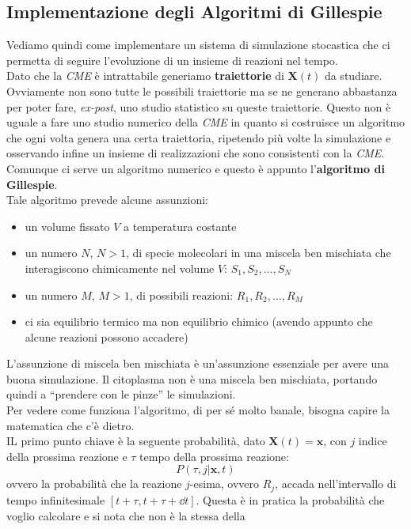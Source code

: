 \documentclass[a4paper,12pt, oneside]{book}
\begin{document}
\subsection{Implementazione degli Algoritmi di Gillespie}
Vediamo quindi come implementare un sistema di simulazione stocastica che ci
permetta di seguire l'evoluzione di un insieme di reazioni nel tempo.\\
Dato che la \textit{CME} è intrattabile generiamo \textbf{traiettorie} di
$\mathbf{X}(t)$ da studiare. Ovviamente non sono tutte le possibili traiettorie
ma se ne generano abbastanza per poter fare, \textit{ex-post}, uno studio
statistico su queste traiettorie. Questo non è uguale a fare uno studio numerico
della \textit{CME} in quanto si costruisce un algoritmo che ogni volta genera
una certa traiettoria, ripetendo più volte la simulazione e osservando infine un
insieme di realizzazioni che sono consistenti con la \textit{CME}.\\
Comunque ci serve un algoritmo numerico e questo è appunto l'\textbf{algoritmo
  di Gillespie}.\\
Tale algoritmo prevede alcune assunzioni:
\begin{itemize}
  \item un volume fissato $V$ a temperatura costante
  \item un numero $N$, $N>1$, di specie molecolari in una miscela ben mischiata
  che interagiscono chimicamente nel volume $V$: $S_1,S_2,\ldots,S_N$ 
  \item un numero $M$, $M>1$, di possibili reazioni: $R_1,R_2,\ldots,R_M$
  \item ci sia equilibrio termico ma non equilibrio chimico (avendo appunto che
  alcune reazioni possono accadere)
\end{itemize}
L'assunzione di miscela ben mischiata è un'assunzione essenziale per avere una
buona simulazione. Il citoplasma non è una miscela ben mischiata, portando
quindi a ``prendere con le pinze'' le simulazioni. \\
Per vedere come funziona l'algoritmo, di per sé molto banale, bisogna capire la
matematica che c'è dietro. \\
IL primo punto chiave è la seguente probabilità, dato
$\mathbf{X}(t)=\mathbf{x}$, con $j$ indice della prossima reazione e $\tau$
tempo della prossima reazione: 
\[P(\tau, j|\mathbf{x},t)\]
ovvero la probabilità che la reazione $j$-esima, ovvero $R_j$, accada
nell'intervallo di tempo infinitesimale $[t+\tau, t+\tau+\dd{t}]$. Questa è in
pratica la probabilità che voglio calcolare e si nota che non è la stessa della
\end{document}

